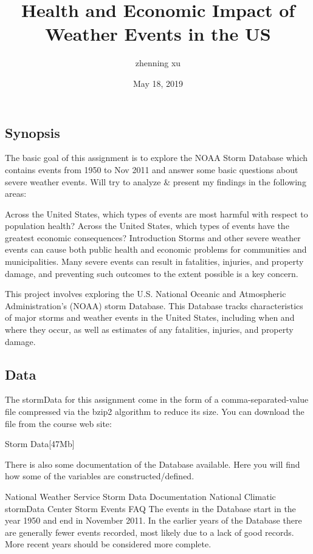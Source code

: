 \documentclass[]{article}
\title{Health and Economic Impact of Weather Events in the US}
\author{zhenning xu}
\date{May 18, 2019}
\begin{document}
\maketitle

{
\setcounter{tocdepth}{2}
\tableofcontents
}
\subsection{Synopsis}\label{synopsis}

The basic goal of this assignment is to explore the NOAA Storm Database
which contains events from 1950 to Nov 2011 and answer some basic
questions about severe weather events. Will try to analyze \& present my
findings in the following areas:

Across the United States, which types of events are most harmful with
respect to population health? Across the United States, which types of
events have the greatest economic consequences? Introduction Storms and
other severe weather events can cause both public health and economic
problems for communities and municipalities. Many severe events can
result in fatalities, injuries, and property damage, and preventing such
outcomes to the extent possible is a key concern.

This project involves exploring the U.S. National Oceanic and
Atmospheric Administration's (NOAA) storm Database. This Database tracks
characteristics of major storms and weather events in the United States,
including when and where they occur, as well as estimates of any
fatalities, injuries, and property damage.

\subsection{Data}\label{data}

The stormData for this assignment come in the form of a
comma-separated-value file compressed via the bzip2 algorithm to reduce
its size. You can download the file from the course web site:

Storm Data{[}47Mb{]}

There is also some documentation of the Database available. Here you
will find how some of the variables are constructed/defined.

National Weather Service Storm Data Documentation National Climatic
stormData Center Storm Events FAQ The events in the Database start in
the year 1950 and end in November 2011. In the earlier years of the
Database there are generally fewer events recorded, most likely due to a
lack of good records. More recent years should be considered more
complete.
\end{document}

